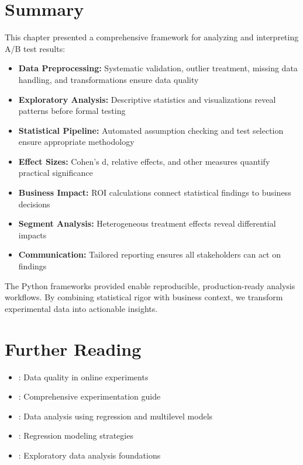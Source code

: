 \section{Summary}

This chapter presented a comprehensive framework for analyzing and interpreting A/B test results:

\begin{itemize}
    \item \textbf{Data Preprocessing:} Systematic validation, outlier treatment, missing data handling, and transformations ensure data quality
    \item \textbf{Exploratory Analysis:} Descriptive statistics and visualizations reveal patterns before formal testing
    \item \textbf{Statistical Pipeline:} Automated assumption checking and test selection ensure appropriate methodology
    \item \textbf{Effect Sizes:} Cohen's d, relative effects, and other measures quantify practical significance
    \item \textbf{Business Impact:} ROI calculations connect statistical findings to business decisions
    \item \textbf{Segment Analysis:} Heterogeneous treatment effects reveal differential impacts
    \item \textbf{Communication:} Tailored reporting ensures all stakeholders can act on findings
\end{itemize}

The Python frameworks provided enable reproducible, production-ready analysis workflows. By combining statistical rigor with business context, we transform experimental data into actionable insights.

\section{Further Reading}

\begin{itemize}
    \item \cite{deng2016data}: Data quality in online experiments
    \item \cite{kohavi2020trustworthy}: Comprehensive experimentation guide
    \item \cite{gelman2006data}: Data analysis using regression and multilevel models
    \item \cite{harrell2015regression}: Regression modeling strategies
    \item \cite{tukey1977exploratory}: Exploratory data analysis foundations
\end{itemize}

